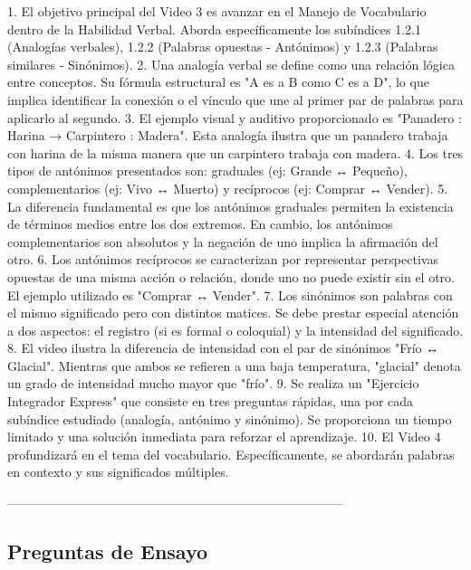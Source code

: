 \documentclass[a4paper,12pt]{ctexart}
\begin{document}
1. El objetivo principal del Video 3 es avanzar en el Manejo de Vocabulario dentro de la Habilidad Verbal. Aborda específicamente los subíndices 1.2.1 (Analogías verbales), 1.2.2 (Palabras opuestas - Antónimos) y 1.2.3 (Palabras similares - Sinónimos).
2. Una analogía verbal se define como una relación lógica entre conceptos. Su fórmula estructural es "A es a B como C es a D", lo que implica identificar la conexión o el vínculo que une al primer par de palabras para aplicarlo al segundo.
3. El ejemplo visual y auditivo proporcionado es "Panadero : Harina → Carpintero : Madera". Esta analogía ilustra que un panadero trabaja con harina de la misma manera que un carpintero trabaja con madera.
4. Los tres tipos de antónimos presentados son: graduales (ej: Grande ↔ Pequeño), complementarios (ej: Vivo ↔ Muerto) y recíprocos (ej: Comprar ↔ Vender).
5. La diferencia fundamental es que los antónimos graduales permiten la existencia de términos medios entre los dos extremos. En cambio, los antónimos complementarios son absolutos y la negación de uno implica la afirmación del otro.
6. Los antónimos recíprocos se caracterizan por representar perspectivas opuestas de una misma acción o relación, donde uno no puede existir sin el otro. El ejemplo utilizado es "Comprar ↔ Vender".
7. Los sinónimos son palabras con el mismo significado pero con distintos matices. Se debe prestar especial atención a dos aspectos: el registro (si es formal o coloquial) y la intensidad del significado.
8. El video ilustra la diferencia de intensidad con el par de sinónimos "Frío ↔ Glacial". Mientras que ambos se refieren a una baja temperatura, "glacial" denota un grado de intensidad mucho mayor que "frío".
9. Se realiza un "Ejercicio Integrador Express" que consiste en tres preguntas rápidas, una por cada subíndice estudiado (analogía, antónimo y sinónimo). Se proporciona un tiempo limitado y una solución inmediata para reforzar el aprendizaje.
10. El Video 4 profundizará en el tema del vocabulario. Específicamente, se abordarán palabras en contexto y sus significados múltiples.

--------------------------------------------------------------------------------

\subsection{Preguntas de Ensayo}
\end{document}
